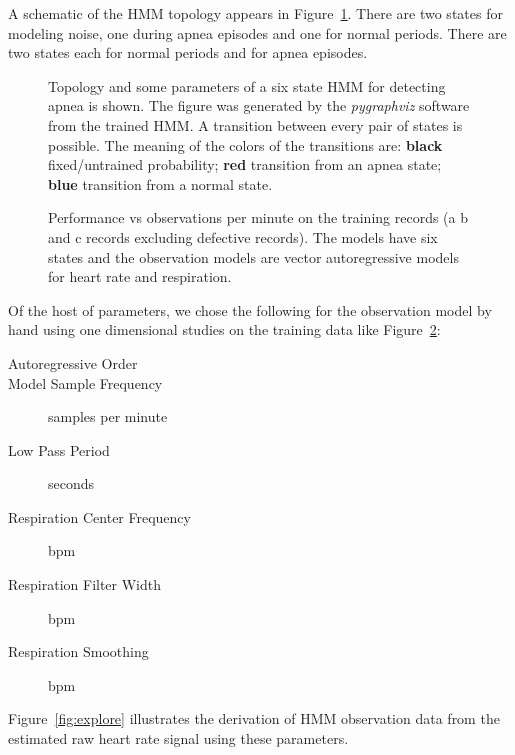 A schematic of the HMM topology appears in Figure~\ref{fig:viz}.
There are two states for modeling noise, one during apnea episodes and
one for normal periods.  There are two states each for normal periods
and for apnea episodes.

\begin{figure}
  \caption[Topology of HMM for detecting apnea.]{Topology and some
    parameters of a six state HMM for detecting apnea is shown.  The
    figure was generated by the \emph{pygraphviz} software from the
    trained HMM.  A transition between every pair of states is
    possible.  The meaning of the colors of the transitions are:
    \textbf{black} fixed/untrained probability; \textbf{red}
    transition from an apnea state; \textbf{blue} transition from a
    normal state.}
  \label{fig:viz}
\end{figure}

\begin{figure}
  \caption[Error rate as a function of sample frequency.]{Performance
    vs observations per minute on the training records (a b and c
    records excluding defective records). The models have six states
    and the observation models are vector autoregressive models for
    heart rate and respiration.}
  \label{fig:errors_vs_fs}
\end{figure}

Of the host of parameters, we chose the following for the observation
model by hand using one dimensional studies on the training data like
Figure~\ref{fig:errors_vs_fs}:
\begin{description}
\item[Autoregressive Order] \ArOrder
\item[Model Sample Frequency] \ModelSampleFrequency samples per minute
\item[Low Pass Period] \LowPassPeriod seconds
\item[Respiration Center Frequency] \RespirationCenterFrequency bpm
\item[Respiration Filter Width] \RespirationFilterWidth bpm
\item[Respiration Smoothing] \RespirationSmoothing bpm
\end{description}
Figure~\ref{fig:explore} illustrates the derivation of HMM observation
data from the estimated raw heart rate signal using these parameters.

